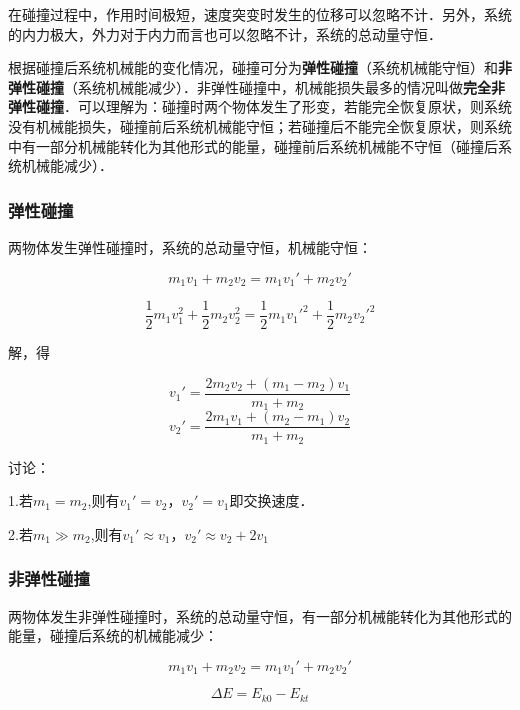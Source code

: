 在碰撞过程中，作用时间极短，速度突变时发生的位移可以忽略不计．另外，系统的内力极大，外力对于内力而言也可以忽略不计，系统的总动量守恒．

根据碰撞后系统机械能的变化情况，碰撞可分为\textbf{弹性碰撞}（系统机械能守恒）和\textbf{非弹性碰撞}（系统机械能减少）．非弹性碰撞中，机械能损失最多的情况叫做\textbf{完全非弹性碰撞}．可以理解为：碰撞时两个物体发生了形变，若能完全恢复原状，则系统没有机械能损失，碰撞前后系统机械能守恒；若碰撞后不能完全恢复原状，则系统中有一部分机械能转化为其他形式的能量，碰撞前后系统机械能不守恒（碰撞后系统机械能减少）．

\subsubsection{弹性碰撞}

两物体发生弹性碰撞时，系统的总动量守恒，机械能守恒：

\begin{equation}
m_1v_1+m_2v_2=m_1v_1'+m_2v_2'
\end{equation}

\begin{equation}
\frac12m_1v_1^2+\frac12m_2v_2^2=\frac12m_1v_1'^2+\frac12m_2v_2'^2
\end{equation}

解，得

\begin{equation}
v_1'= \frac{2m_2v_2 + (m_1 - m_2)v_1}{m_1+m_2}
\end{equation}
\begin{equation}
v_2'= \frac{2m_1v_1 + (m_2 - m_1)v_2}{m_1+m_2}
\end{equation}

讨论：

1.若$m_1=m_2$,则有$v_1'=v_2$，$v_2'=v_1$即交换速度．

2.若$m_1\gg m_2$,则有$v_1'\approx v_1$，$v_2'\approx v_2+2v_1$

\subsubsection{非弹性碰撞}

两物体发生非弹性碰撞时，系统的总动量守恒，有一部分机械能转化为其他形式的能量，碰撞后系统的机械能减少：

\begin{equation}
m_1v_1+m_2v_2=m_1v_1'+m_2v_2'
\end{equation}

\begin{equation}
\Delta E = E_{k0}-E_{kt}
\end{equation}

